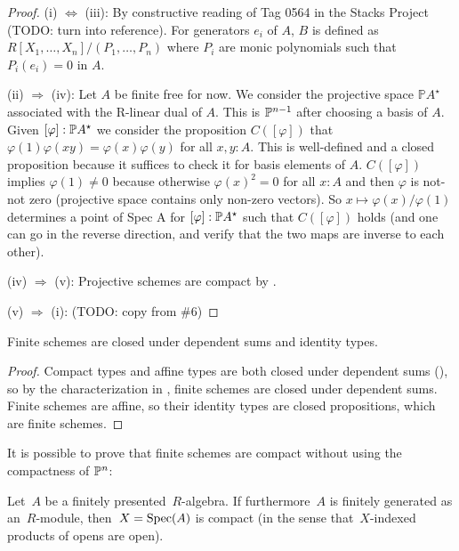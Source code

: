 \begin{proof}
  (i) $\Leftrightarrow$ (iii): By constructive reading of Tag 0564 in the Stacks Project (TODO: turn into reference).
  For generators $e_i$ of $A$, $B$ is defined as $R[X_1,\dots,X_n]/(P_1,\dots,P_n)$ where $P_i$ are monic polynomials such that $P_i(e_i)=0$ in $A$.
  
  (ii) $\Rightarrow$ (iv): 
  Let $A$ be finite free for now.
  We consider the projective space $\mathbb PA^\star$ associated with the R-linear dual of $A$.
  This is $\mathbb{P}^{n-1}$ after choosing a basis of $A$.
  Given $[\varphi] : \mathbb{P} A^\star$ we consider the proposition $C([\varphi])$ that $\varphi(1) \varphi(xy) = \varphi(x) \varphi(y)$ for all $x, y  : A$.
  This is well-defined and a closed proposition because it suffices to check it for basis elements of $A$.
  $C([\varphi])$ implies $\varphi(1) \ne 0$ because otherwise $\varphi(x)^2 = 0$ for all $x : A$ and then $\varphi$ is not-not zero (projective space contains only non-zero vectors).
  So $x \mapsto \varphi(x) / \varphi(1)$ determines a point of Spec A for $[\varphi] : \mathbb{P} A^\star$ such that $C([\varphi])$ holds (and one can go in the reverse direction, and verify that the two maps are inverse to each other).

  (iv) $\Rightarrow$ (v): Projective schemes are compact by \cite[Theorem 3.0.7]{proper-draft}. 
  
  (v) $\Rightarrow$ (i): (TODO: copy from \#6)
\end{proof}

\begin{lemma}
  Finite schemes are closed under dependent sums and identity types.
\end{lemma}

\begin{proof}
  Compact types and affine types are both closed under dependent sums (\cite[Lemma 2.0.3]{proper-draft}), so by the characterization in ,
  finite schemes are closed under dependent sums.
  Finite schemes are affine, so their identity types are closed propositions, which are finite schemes.
\end{proof}

It is possible to prove that finite schemes are compact without using the compactness of $\mathbb{P}^n$:

\begin{proposition}\label{finite-compact}
Let~$A$ be a finitely presented~$R$-algebra. If furthermore~$A$ is finitely
generated as an~$R$-module, then~$X = \operatorname{Spec}(A)$ is compact (in the sense
that~$X$-indexed products of opens are open).\end{proposition}

